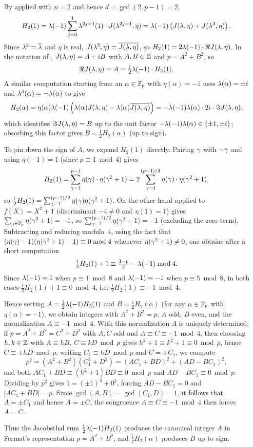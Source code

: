 By  applied with $n=2$ and hence $d=\gcd(2,p-1)=2$,
$$H_2(1)=\lambda(-1)\sum_{j=0}^{1}\lambda^{2j+1}(1)\cdot J(\lambda^{2j+1},\eta)=\lambda(-1)\left(J(\lambda,\eta)+J(\lambda^3,\eta)\right).$$
Since $\lambda^3=\overline{\lambda}$ and $\eta$ is real, $J(\lambda^3,\eta)=\overline{J(\lambda,\eta)}$, so $H_2(1)=2\lambda(-1)\cdot\Re J(\lambda,\eta)$. In the notation of , $J(\lambda,\eta)=A+iB$ with $A,B\in\mathbb{Z}$ and $p=A^2+B^2$, so
$$\Re J(\lambda,\eta)=A=\tfrac12\lambda(-1)\cdot H_2(1).$$
A similar computation starting from an $\alpha\in\mathbb{F}_p$ with $\eta(\alpha)=-1$ uses $\lambda(\alpha)=\pm i$ and $\lambda^3(\alpha)=-\lambda(\alpha)$ to give
$$H_2(\alpha)=\eta(\alpha)\lambda(-1)\left(\lambda(\alpha)J(\lambda,\eta)-\lambda(\alpha)\overline{J(\lambda,\eta)}\right)=-\lambda(-1)\lambda(\alpha)\cdot 2i\cdot \Im J(\lambda,\eta),$$
which identifies $\Im J(\lambda,\eta)=B$ up to the unit factor $-\lambda(-1)\lambda(\alpha)\in\{\pm 1,\pm i\}$; absorbing this factor gives $B=\tfrac12 H_2(\alpha)$ (up to sign).

To pin down the sign of $A$, we expand $H_2(1)$ directly. Pairing $\gamma$ with $-\gamma$ and using $\eta(-1)=1$ (since $p\equiv 1\bmod 4$) gives $$H_2(1)=\sum_{\gamma=1}^{p-1}\eta(\gamma)\cdot \eta(\gamma^2+1)=2\sum_{\gamma=1}^{(p-1)/2}\eta(\gamma)\cdot \eta(\gamma^2+1),$$so $\tfrac12 H_2(1)=\sum_{\gamma=1}^{(p-1)/2}\eta(\gamma)\eta(\gamma^2+1)$. On the other hand  applied to $f(X)=X^2+1$ (discriminant $-4\neq 0$ and $\eta(1)=1$) gives $\sum_{\gamma\in\mathbb{F}_p}\eta(\gamma^2+1)=-1$, so $\sum_{\gamma=1}^{(p-1)/2}\eta(\gamma^2+1)=-1$ (excluding the zero term). Subtracting and reducing modulo~$4$, using the fact that $(\eta(\gamma)-1)(\eta(\gamma^2+1)-1)\equiv 0\bmod 4$ whenever $\eta(\gamma^2+1)\neq 0$, one obtains after a short computation $$\tfrac12 H_2(1)+1\equiv \tfrac{3-p}{2}-\lambda(-1)\bmod 4.$$Since $\lambda(-1)=1$ when $p\equiv 1\bmod 8$ and $\lambda(-1)=-1$ when $p\equiv 5\bmod 8$, in both cases $\tfrac12 H_2(1)+1\equiv 0\bmod 4$, i.e. $\tfrac12 H_2(1)\equiv -1\bmod 4$.

Hence setting $A=\tfrac12\lambda(-1)H_2(1)$ and $B=\tfrac12 H_2(\alpha)$ (for any $\alpha\in\mathbb{F}_p$ with $\eta(\alpha)=-1$), we obtain integers with $A^2+B^2=p$, $A$ odd, $B$ even, and the normalization $A\equiv -1\bmod 4$. With this normalization $A$ is uniquely determined: if $p=A^2+B^2=C^2+D^2$ with $A,C$ odd and $A\equiv C\equiv -1\bmod 4$, then choosing $h,k\in\mathbb{Z}$ with $A\equiv hB,\ C\equiv kD\bmod p$ gives $h^2+1\equiv k^2+1\equiv 0\bmod p$, hence $C\equiv \pm hD\bmod p$; writing $C_1\equiv hD\bmod p$ and $C=\pm C_1$, we compute $$p^2=(A^2+B^2)(C_1^2+D^2)=(AC_1+BD)^2+(AD-BC_1)^2,$$ and both $AC_1+BD\equiv (h^2+1)BD\equiv 0\bmod p$ and $AD-BC_1\equiv 0\bmod p$. Dividing by $p^2$ gives $1=(\pm 1)^2+0^2$, forcing $AD-BC_1=0$ and $|AC_1+BD|=p$. Since $\gcd(A,B)=\gcd(C_1,D)=1$, it follows that $A=\pm C_1$ and hence $A=\pm C$; the congruence $A\equiv C\equiv -1\bmod 4$ then forces $A=C$.

Thus the Jacobsthal sum $\tfrac12\lambda(-1)H_2(1)$ produces the canonical integer $A$ in Fermat's representation $p=A^2+B^2$, and $\tfrac12 H_2(\alpha)$ produces $B$ up to sign.